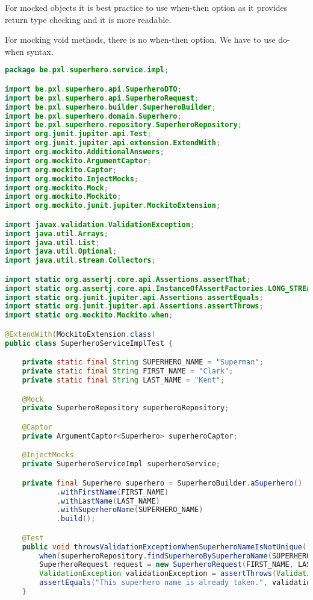 For mocked objects it is best practice to use when-then option as it provides return type checking and it is more readable.

For mocking void methods, there is no when-then option. We have to use do-when syntax.

 
 \begin{lstlisting}[frame=single, language=java]
package be.pxl.superhero.service.impl;

import be.pxl.superhero.api.SuperheroDTO;
import be.pxl.superhero.api.SuperheroRequest;
import be.pxl.superhero.builder.SuperheroBuilder;
import be.pxl.superhero.domain.Superhero;
import be.pxl.superhero.repository.SuperheroRepository;
import org.junit.jupiter.api.Test;
import org.junit.jupiter.api.extension.ExtendWith;
import org.mockito.AdditionalAnswers;
import org.mockito.ArgumentCaptor;
import org.mockito.Captor;
import org.mockito.InjectMocks;
import org.mockito.Mock;
import org.mockito.Mockito;
import org.mockito.junit.jupiter.MockitoExtension;

import javax.validation.ValidationException;
import java.util.Arrays;
import java.util.List;
import java.util.Optional;
import java.util.stream.Collectors;

import static org.assertj.core.api.Assertions.assertThat;
import static org.assertj.core.api.InstanceOfAssertFactories.LONG_STREAM;
import static org.junit.jupiter.api.Assertions.assertEquals;
import static org.junit.jupiter.api.Assertions.assertThrows;
import static org.mockito.Mockito.when;

@ExtendWith(MockitoExtension.class)
public class SuperheroServiceImplTest {

	private static final String SUPERHERO_NAME = "Superman";
	private static final String FIRST_NAME = "Clark";
	private static final String LAST_NAME = "Kent";

	@Mock
	private SuperheroRepository superheroRepository;

	@Captor
	private ArgumentCaptor<Superhero> superheroCaptor;

	@InjectMocks
	private SuperheroServiceImpl superheroService;

	private final Superhero superhero = SuperheroBuilder.aSuperhero()
			.withFirstName(FIRST_NAME)
			.withLastName(LAST_NAME)
			.withSuperheroName(SUPERHERO_NAME)
			.build();

	@Test
	public void throwsValidationExceptionWhenSuperheroNameIsNotUnique() {
		when(superheroRepository.findSuperheroBySuperheroName(SUPERHERO_NAME)).thenReturn(Optional.of(superhero));
		SuperheroRequest request = new SuperheroRequest(FIRST_NAME, LAST_NAME, SUPERHERO_NAME);
		ValidationException validationException = assertThrows(ValidationException.class, () -> superheroService.createSuperhero(request));
		assertEquals("This superhero name is already taken.", validationException.getMessage());
	}


\end{lstlisting}
